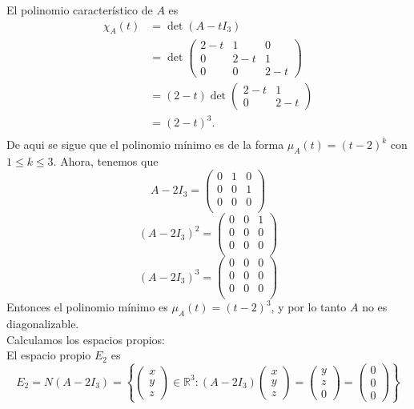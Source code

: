 \documentclass[11pt]{article}
\newcommand{\R}{\mathbb{R}}
\begin{document}
\begin{Solucion}
El polinomio característico de \( A \) es
\begin{align*}
  \chi_A(t)&=\det(A-tI_3)\\&=\det\begin{pmatrix} 2-t & 1 & 0 \\ 0 & 2-t & 1 \\ 0 & 0 & 2-t \end{pmatrix} \\
  &=(2-t)\det\begin{pmatrix} 2-t & 1 \\ 0 & 2-t \end{pmatrix}\\ &=(2-t)^3. \\
\end{align*}
De aqui se sigue que el polinomio mínimo es de la forma \( \mu_A(t)=(t-2)^k \) con \( 1\leq k \leq 3 \).
Ahora, tenemos que
\[
A-2I_3=\begin{pmatrix}0&1&0\\0&0&1\\0&0&0\\ \end{pmatrix}
\]
\[
(A-2I_3)^2=\begin{pmatrix}0&0&1\\0&0&0\\0&0&0\\ \end{pmatrix}
\]
\[
(A-2I_3)^3=\begin{pmatrix}0&0&0\\0&0&0\\0&0&0\\ \end{pmatrix}
\]
Entonces el polinomio mínimo es \( \mu_A(t)=(t-2)^3 \), y por lo tanto \( A \) no es diagonalizable.\\
Calculamos los espacios propios: \\
El espacio propio \( E_2 \) es
\[E_2=N(A-2I_3)=\left\lbrace \begin{pmatrix}x\\y\\z \end{pmatrix}\in \R^3 : (A-2I_3)\begin{pmatrix}x\\y\\z \end{pmatrix}=
\begin{pmatrix}y\\z\\0 \end{pmatrix}=\begin{pmatrix}0\\0\\0 \end{pmatrix}\right\rbrace 
\]
\end{Solucion}
\end{document}
